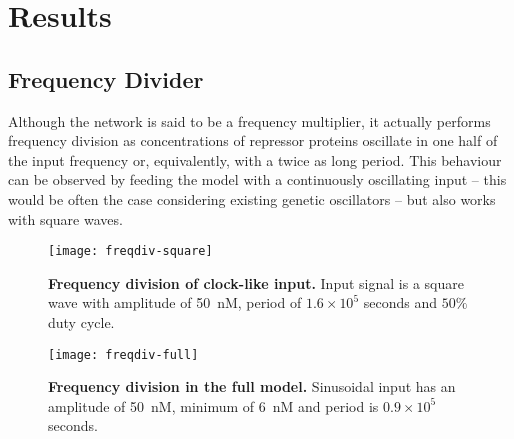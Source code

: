 

\section{Results}

  \subsection{Frequency Divider}

    Although the network is said to be a frequency multiplier, it actually performs frequency division as concentrations of repressor proteins oscillate in one half of the input frequency or, equivalently, with a twice as long period.
    This behaviour can be observed by feeding the model with a continuously oscillating input -- this would be often the case considering existing genetic oscillators \cite{optoscillator} -- but also works with square waves.

    \begin{figure}[!htbp]
      \centering
      \texttt{[image: freqdiv-square]}
      \caption{\textbf{Frequency division of clock-like input.} Input signal is a square wave with amplitude of \SI{50}{\nano M}, period of $1.6 \times 10^5$ seconds and $50\%$ duty cycle.}
      \label{fig:freqdiv-square}
    \end{figure}

    \begin{figure}[!htbp]
      \centering
      \texttt{[image: freqdiv-full]}
      \caption{\textbf{Frequency division in the full model.} Sinusoidal input has an amplitude of \SI{50}{\nano M}, minimum of \SI{6}{\nano M} and period is $0.9 \times 10^5$ seconds.}
      \label{fig:freqdiv-full}
    \end{figure}

